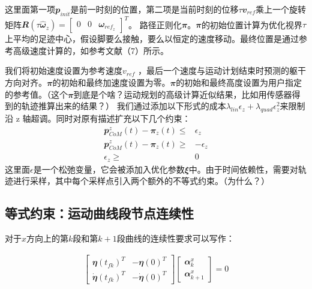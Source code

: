 这里面第一项${\mathbfit p}_{init}$是前一时刻的位置，第二项是当前时刻的位移$\tau {\mathbfit v}_{ref}$乘上一个旋转矩阵${\mathbfit R}(\tau \hat {\mathbfit \omega}_z)=\begin{bmatrix}0 & 0 & {\mathbfit \omega}_{ref_z}\end{bmatrix}^T$。
路径正则化${\mathbfit  \pi}$。$\mathbfit \pi$的初始位置计算为优化视界$\tau$上平均的足迹中心，假设脚要么接触，要么以恒定的速度移动。最终位置是通过参考高级速度计算的，如参考文献（7）所示。

我们将初始速度设置为参考速度$v_{ref}$ ，最后一个速度与运动计划结束时预测的躯干方向对齐。${\mathbfit  \pi}$的初始和最终加速度设置为零。${\mathbfit  \pi}$的初始和最终高度设置为用户指定的参考值。（这个${\mathbfit  \pi}$到底是个啥？运动规划的高级计算近似结果，比如用传感器得到的轨迹推算出来的结果？）
我们通过添加以下形式的成本$\lambda_{lin}\epsilon_z+\lambda_{quad}\epsilon_z^2$来限制沿 z 轴超调。同时对原有描述扩充以下几个约束：
\begin{align}
    {\mathbfit p}_{CoM}^z(t)-{\mathbfit \pi}_z(t)\leq &\epsilon_z \\
    {\mathbfit p}_{CoM}^z(t)-{\mathbfit \pi}_z(t)\geq & -\epsilon_z \\
    \epsilon_z \geq & 0
\end{align}
这里面$\epsilon$是一个松弛变量，它会被添加入优化参数${\mathbfit \xi}$中。由于时间依赖性，需要对轨迹进行采样，其中每个采样点引入两个额外的不等式约束。（为什么？）

\subsection{等式约束：运动曲线段节点连续性}
对于$x$方向上的第$k$段和第$k+1$段曲线的连续性要求可以写作：

\begin{align}
    \begin{bmatrix}
    {\mathbfit \eta}(t_{fk})^T & -{\mathbfit \eta}(0)^T \\ \dot {\mathbfit \eta}(t_{fk})^T & - \dot {\mathbfit \eta}(0)^T
    \end{bmatrix}
    \begin{bmatrix}
    {\mathbfit \alpha}_k^x \\ {\mathbfit \alpha}_{k+1}^x
    \end{bmatrix} = 0
\end{align}


